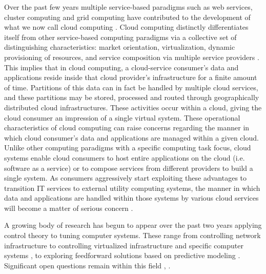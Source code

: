\documentclass{sig-alternate}
\begin{document}
Over the past few years multiple service-based paradigms such as web services, cluster computing and grid computing have contributed to the development of what we now call cloud computing \cite{Bu:09}. Cloud computing distinctly differentiates itself from other service-based computing paradigms via a collective set of distinguishing characteristics:  market orientation, virtualization, dynamic provisioning of resources, and service composition via multiple service providers \cite{BuYeVeBrBr:09}. This implies that in cloud computing, a cloud-service consumer's data and applications reside inside that cloud provider's infrastructure for a finite amount of time.  Partitions of this data can in fact be handled by multiple cloud services, and these partitions may be stored, processed and routed through geographically distributed cloud infrastructures. These activities occur within a cloud, giving the cloud consumer an impression of a single virtual system.  These operational characteristics of cloud computing can raise concerns regarding the manner in which cloud consumer's data and applications are managed within a given cloud. Unlike other computing paradigms with a specific computing task focus, cloud systems enable cloud consumers to host entire applications on the cloud (i.e. software as a service) or to compose services from different providers to build a single system. As consumers aggressively start exploiting these advantages to transition IT services to external utility computing systems, the manner in which data and applications are handled within those systems by various cloud services will become a matter of serious concern \cite{Jamkhedkar:2010:IUM:1866870.1866885}.

A growing body of research has begun to appear over the past two years applying control theory to tuning computer systems.  These range from controlling network infrastructure \cite{ctrl:ariba-GL:2009} to controlling virtualized infrastructure and specific computer systems \cite{ctrl:wang-cgswrzh:2009}, \cite{ctrl:kjaer-kr:2009} to exploring feedforward solutions based on predictive modeling \cite{ctrl:abdelwahed-bsk:2009}.  Significant open questions remain within this field \cite{ctrl:Zhu:2009:CTB:1496909.1496922}, \cite{ctrl:hellerstein-sw:2009}.

\end{document}
